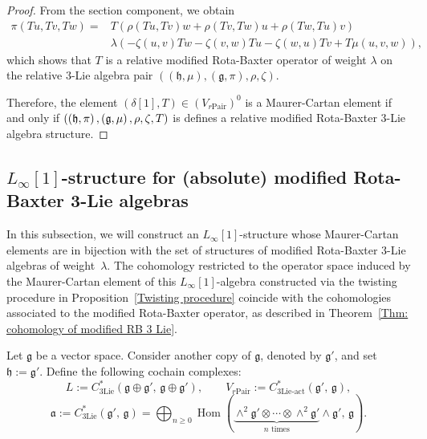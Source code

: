 \documentclass[12pt]{amsart}
\theoremstyle{definition}
\begin{document}
\begin{proof}
	From the section component, we obtain
	\begin{align*}
		\pi(Tu,Tv,Tw)=&T\left( \rho(Tu,Tv)w+\rho(Tv,Tw)u+\rho(Tw,Tu)v\right) \\
		&\lambda\left( -\zeta(u,v)Tw-\zeta(v,w)Tu-\zeta(w,u)Tv+T\mu(u,v,w)\right) ,
	\end{align*}
	which shows that $T$ is a relative modified Rota-Baxter operator of weight $\lambda$ on the relative $3$-Lie algebra pair   $\left( \left(\mathfrak{h},\mu\right),\left(\mathfrak{g},\pi\right),\rho,\zeta \right) $.
	
	Therefore,  the element   $(\delta[1], T)\in (V_{r\mathrm{Pair}})^0$ is  a  Maurer-Cartan element if and only if  $( \left(\mathfrak{h},\pi\right),\left(\mathfrak{g},\mu\right),\\ \rho,\zeta, T) $  is   defines a relative modified Rota-Baxter $3$-Lie algebra structure.
\end{proof}




\subsection{$L_\infty[1]$-structure for (absolute) modified Rota-Baxter 3-Lie algebras}\label{L infty  structure for  modified Rota-Baxter 3-Lie algebras}
In this subsection, we will construct an $L_\infty[1]$-structure  whose Maurer-Cartan elements are in bijection with the set of structures of  modified Rota-Baxter $3$-Lie algebras of weight~$\lambda$. The cohomology restricted to the operator space induced by the Maurer-Cartan element of this $L_\infty[1]$-algebra constructed via the twisting procedure in Proposition~\ref{Twisting procedure} coincide with the cohomologies associated to the modified Rota-Baxter operator, as described in Theorem~\ref{Thm: cohomology of modified RB 3 Lie}.


Let $\mathfrak{g}$ be a vector space. Consider another copy of $\mathfrak{g}$, denoted by $\mathfrak{g}'$, and set $\mathfrak{h} := \mathfrak{g}'$. Define the following cochain complexes:
\[
L := C^*_{\mathrm{3Lie}}(\mathfrak{g} \oplus \mathfrak{g}',\, \mathfrak{g} \oplus \mathfrak{g}'), \qquad
V_{r\mathrm{Pair}} := C^*_{\mathrm{3Lie\text{-}act}}(\mathfrak{g}',\, \mathfrak{g}),
\]
\[
\mathfrak{a} := C^*_{\mathrm{3Lie}}(\mathfrak{g}',\, \mathfrak{g})
= \bigoplus_{n \geq 0} \operatorname{Hom}\left(
\underbrace{\wedge^2 \mathfrak{g}' \otimes \cdots \otimes \wedge^2 \mathfrak{g}'}_{n \text{ times}} \wedge \mathfrak{g}',\, \mathfrak{g}
\right).
\]
\end{document}
